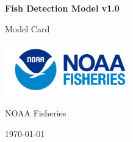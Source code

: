 \documentclass[11pt,oneside,openany]{scrbook}
\begin{document}
\begin{titlepage}
    \centering
    \vspace*{2cm}
    {\Huge\bfseries\textcolor{noaablue}{Fish Detection Model v1.0}\par}
    \vspace{1cm}
    {\Large Model Card\par}
    \vspace{1cm}
    \includegraphics[width=0.4\textwidth]{assets/logo.png}\par
    \vfill
    {\Large\textcolor{noaablue}{NOAA Fisheries}}\par
    {\large\today}\par
\end{titlepage}

\tableofcontents
\newpage
\end{document}
